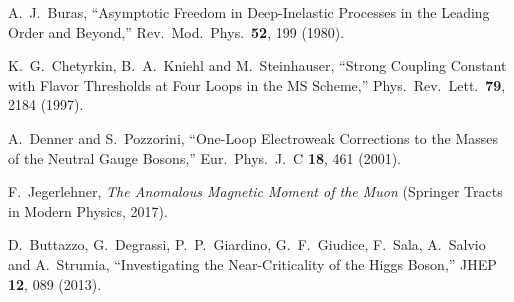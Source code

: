 \documentclass[epjc3]{svjour3}
\begin{document}
\begin{thebibliography}{99}
A.~J.~Buras,
``Asymptotic Freedom in Deep-Inelastic Processes in the Leading Order and Beyond,''
Rev.\ Mod.\ Phys.\ \textbf{52}, 199 (1980).

K.~G.~Chetyrkin, B.~A.~Kniehl and M.~Steinhauser,
``Strong Coupling Constant with Flavor Thresholds at Four Loops in the MS Scheme,''
Phys.\ Rev.\ Lett.\ \textbf{79}, 2184 (1997).

A.~Denner and S.~Pozzorini,
``One-Loop Electroweak Corrections to the Masses of the Neutral Gauge Bosons,''
Eur.\ Phys.\ J.\ C \textbf{18}, 461 (2001).

F.~Jegerlehner,
\textit{The Anomalous Magnetic Moment of the Muon} (Springer Tracts in Modern Physics, 2017).

D.~Buttazzo, G.~Degrassi, P.~P.~Giardino, G.~F.~Giudice, F.~Sala, A.~Salvio and A.~Strumia,
``Investigating the Near-Criticality of the Higgs Boson,''
JHEP \textbf{12}, 089 (2013).

\end{thebibliography}
\end{document}
